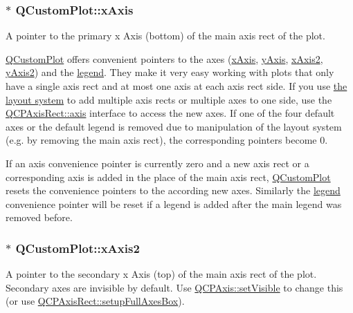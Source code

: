\subsubsection[{\texorpdfstring{x\+Axis}{xAxis}}]{ $\ast$ Q\+Custom\+Plot\+::x\+Axis}\hypertarget{classQCustomPlot_a9a79cd0158a4c7f30cbc702f0fd800e4}{}\label{classQCustomPlot_a9a79cd0158a4c7f30cbc702f0fd800e4}
A pointer to the primary x Axis (bottom) of the main axis rect of the plot.

\hyperlink{classQCustomPlot}{Q\+Custom\+Plot} offers convenient pointers to the axes (\hyperlink{classQCustomPlot_a9a79cd0158a4c7f30cbc702f0fd800e4}{x\+Axis}, \hyperlink{classQCustomPlot_af6fea5679725b152c14facd920b19367}{y\+Axis}, \hyperlink{classQCustomPlot_ada41599f22cad901c030f3dcbdd82fd9}{x\+Axis2}, \hyperlink{classQCustomPlot_af13fdc5bce7d0fabd640f13ba805c0b7}{y\+Axis2}) and the \hyperlink{classQCustomPlot_a4eadcd237dc6a09938b68b16877fa6af}{legend}. They make it very easy working with plots that only have a single axis rect and at most one axis at each axis rect side. If you use \hyperlink{}{the layout system} to add multiple axis rects or multiple axes to one side, use the \hyperlink{classQCPAxisRect_a560de44e47a4af0f86c59102a094b1e4}{Q\+C\+P\+Axis\+Rect\+::axis} interface to access the new axes. If one of the four default axes or the default legend is removed due to manipulation of the layout system (e.\+g. by removing the main axis rect), the corresponding pointers become 0.

If an axis convenience pointer is currently zero and a new axis rect or a corresponding axis is added in the place of the main axis rect, \hyperlink{classQCustomPlot}{Q\+Custom\+Plot} resets the convenience pointers to the according new axes. Similarly the \hyperlink{classQCustomPlot_a4eadcd237dc6a09938b68b16877fa6af}{legend} convenience pointer will be reset if a legend is added after the main legend was removed before. 
\subsubsection[{\texorpdfstring{x\+Axis2}{xAxis2}}]{ $\ast$ Q\+Custom\+Plot\+::x\+Axis2}\hypertarget{classQCustomPlot_ada41599f22cad901c030f3dcbdd82fd9}{}\label{classQCustomPlot_ada41599f22cad901c030f3dcbdd82fd9}
A pointer to the secondary x Axis (top) of the main axis rect of the plot. Secondary axes are invisible by default. Use \hyperlink{classQCPLayerable_a3bed99ddc396b48ce3ebfdc0418744f8}{Q\+C\+P\+Axis\+::set\+Visible} to change this (or use \hyperlink{classQCPAxisRect_a5fa906175447b14206954f77fc7f1ef4}{Q\+C\+P\+Axis\+Rect\+::setup\+Full\+Axes\+Box}).

